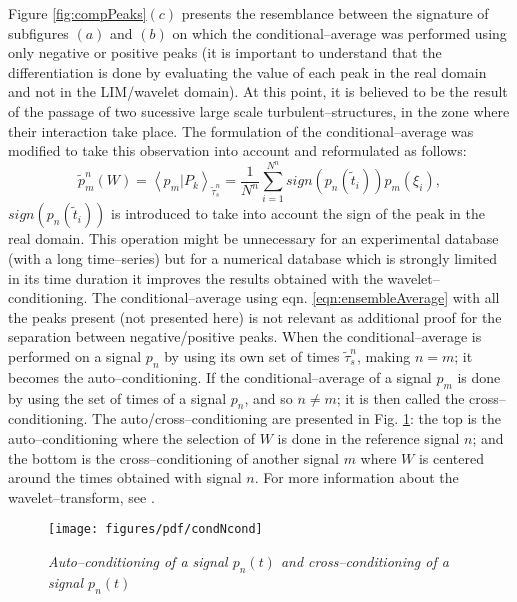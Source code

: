Figure \ref{fig:compPeaks}$(c)$ presents the resemblance between the signature of subfigures $(a)$ and $(b)$ on which the conditional--average was performed using only negative or positive peaks (it is important to understand that the differentiation is done by evaluating the value of each peak in the real domain and not in the LIM/wavelet domain). At this point, it is believed to be the result of the passage of two sucessive large scale turbulent--structures, in the zone where their interaction take place.
The formulation of the conditional--average was modified to take this observation into account and reformulated as follows:
\begin{equation} \label{eqn:condAvgSign}
  \tilde{p}_{m}^n\left( W \right) = \left< p_{m} | P_{k} \right>_{\tilde{\tau}^n_{s}} = \frac{1}{N^n} \sum^{N^n}_{i = 1} sign\left( p_{n} \left( \tilde{t}_{i} \right) \right) p_{m} \left( \xi_{i} \right),
\end{equation}
$sign\left( p_{n} \left( \tilde{t}_{i} \right) \right)$ is introduced to take into account the sign of the peak in the real domain. This operation might be unnecessary for an experimental database (with a long time--series) but for a numerical database which is strongly limited in its time duration it improves the results obtained with the wavelet--conditioning.
The conditional--average using eqn. \ref{eqn:ensembleAverage} with all the peaks present (not presented here) is not relevant as additional proof for the separation between negative/positive peaks.
When the conditional--average is performed on a signal $p_{n}$ by using its own set of times ${\tilde{\tau}^n_{s}}$, making $n = m$; it becomes the auto--conditioning. If the conditional--average of a signal $p_{m}$ is done by using the set of times of a signal $p_{n}$, and so $n \neq m$; it is then called the cross--conditioning. The auto/cross--conditioning are presented in Fig.  \ref{fig:condNcond}: the top is the auto--conditioning where the selection of $W$ is done in the reference signal $n$; and the bottom is the cross--conditioning of another signal $m$ where $W$ is centered around the times obtained with signal $n$. For more information about the wavelet--transform, see \cite{Farge1992}.
 \begin{figure}[!ht]
\centering
    \texttt{[image: figures/pdf/condNcond]}
\caption{\textit{Auto--conditioning of a signal $p_n(t)$ and cross--conditioning of a signal $p_n(t)$}}
\label{fig:condNcond}
\end{figure}